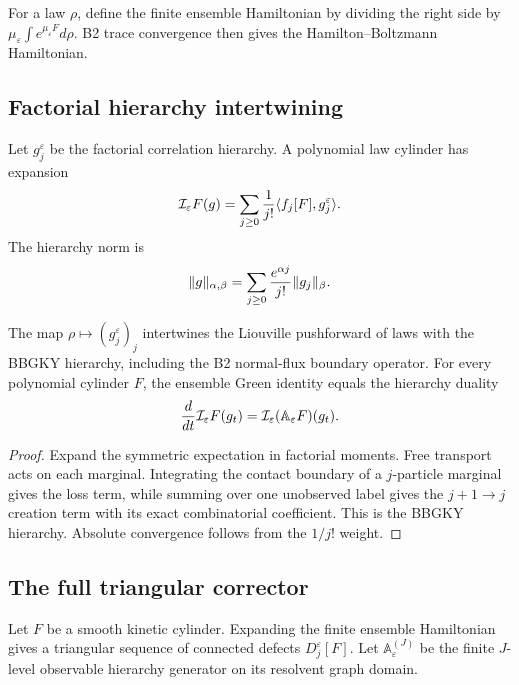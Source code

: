 For a law \(\rho\), define the finite ensemble Hamiltonian by dividing the
right side by
\(\mu_\varepsilon\int e^{\mu_\varepsilon F}d\rho\).  B2 trace convergence
then gives the Hamilton--Boltzmann Hamiltonian.

\subsection{Factorial hierarchy intertwining}

Let \(g_j^\varepsilon\) be the factorial correlation hierarchy.  A polynomial
law cylinder has expansion
\[
 \mathcal I_\varepsilon F(g)
 =
 \sum_{j\ge0}{1\over j!}
 \langle f_j[F],g_j^\varepsilon\rangle .
\]
The hierarchy norm is
\[
 \|g\|_{\alpha,\beta}
 =
 \sum_{j\ge0}{e^{\alpha j}\over j!}
 \|g_j\|_\beta .
\]

\begin{lemma}
\label{lem:r14-b4-intertwine}
The map \(\rho\mapsto(g_j^\varepsilon)_j\) intertwines the Liouville
pushforward of laws with the BBGKY hierarchy, including the B2 normal-flux
boundary operator.  For every polynomial cylinder \(F\), the ensemble Green
identity equals the hierarchy duality
\[
 {d\over dt}\mathcal I_\varepsilon F(g_t)
 =
 \mathcal I_\varepsilon(\mathbb A_\varepsilon F)(g_t).
\]
\end{lemma}

\begin{proof}
Expand the symmetric expectation in factorial moments.  Free transport acts
on each marginal.  Integrating the contact boundary of a \(j\)-particle
marginal gives the loss term, while summing over one unobserved label gives
the \(j+1\to j\) creation term with its exact combinatorial coefficient.
This is the BBGKY hierarchy.  Absolute convergence follows from the
\(1/j!\) weight.
\end{proof}

\subsection{The full triangular corrector}

Let \(F\) be a smooth kinetic cylinder.  Expanding the finite ensemble
Hamiltonian gives a triangular sequence of connected defects
\(D_j^\varepsilon[F]\).  Let \(\mathbb A_{\varepsilon}^{(J)}\) be the
finite \(J\)-level observable hierarchy generator on its resolvent graph
domain.


